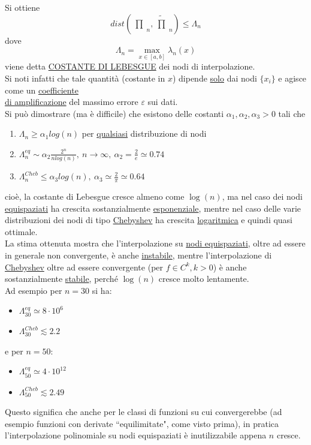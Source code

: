 \documentclass[12pt]{article}
\newcommand{\inter}{\begin{matrix}\prod\end{matrix}}
\begin{document}
Si ottiene
\[ dist\left(\inter_n,\tilde{\inter}_n\right)\leq \Lambda_n \]
dove 
\[\Lambda_n= \max_{x\in[a,b]}\lambda_n(x)\]
viene detta \uline{COSTANTE DI LEBESGUE} dei nodi di interpolazione.\\
Si noti infatti che tale quantità (costante in $x$) dipende \uline{solo} dai nodi $\{ x_i \}$ e agisce come un \uline{coefficiente}\\ \uline{di amplificazione} del massimo errore $\varepsilon$ sui dati.\\
Si può dimostrare (ma è difficile) che esistono delle costanti $\alpha_1, \alpha_2, \alpha_3 > 0$ tali che
\begin{enumerate}
    \item $\Lambda_n \geq \alpha_1 log(n)$ per \uline{qualsiasi} distribuzione di nodi
    \item $\Lambda^{eq}_n \sim \alpha_2 \frac{2^n}{nlog(n)}, \ n \to \infty, \ \alpha_2 = \frac{2}{e} \simeq 0.74$
    \item $\Lambda^{Cheb}_n \leq \alpha_3 log(n), \ \alpha_3 \simeq \frac{2}{\pi} \simeq 0.64$
\end{enumerate}
cioè, la costante di Lebesgue cresce almeno come $\log(n)$, ma nel caso dei nodi \uline{equispaziati} ha crescita sostanzialmente \uline{esponenziale}, mentre nel caso delle varie distribuzioni dei nodi di tipo \uline{Chebyshev} ha crescita \uline{logaritmica} e quindi quasi ottimale.\\
La stima ottenuta mostra che l'interpolazione su \uline{nodi equispaziati}, oltre ad essere in generale non convergente, è anche \uline{instabile}, mentre l'interpolazione di \uline{Chebyshev} oltre ad essere convergente (per $f \in C^k, k>0$) è anche sostanzialmente \uline{stabile}, perché $\log(n)$ cresce molto lentamente.\\
Ad esempio per $n=30$ si ha:
\begin{itemize}
\item $\Lambda^{eq}_{30} \simeq 8 \cdot 10^6$
\item $\Lambda^{Cheb}_{30} \lesssim 2.2$
\end{itemize}
e per $n=50$:
\begin{itemize}
\item $\Lambda^{eq}_{50} \simeq 4 \cdot 10^{12}$
\item $\Lambda^{Cheb}_{50} \lesssim 2.49$
\end{itemize}
Questo significa che anche per le classi di funzioni su cui convergerebbe (ad esempio funzioni con derivate ``equilimitate", come visto prima), in pratica l'interpolazione polinomiale su nodi equispaziati è inutilizzabile appena $n$ cresce.\\
\end{document}
